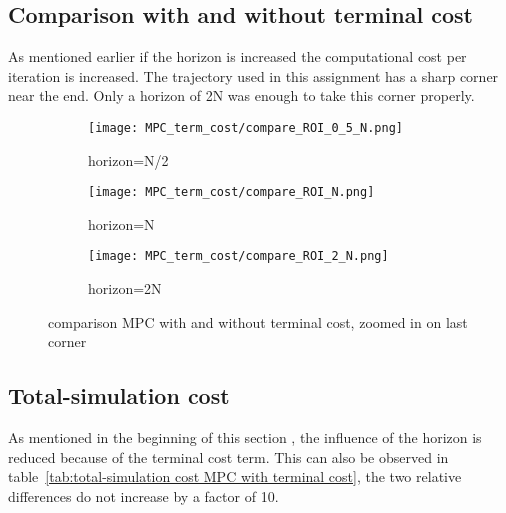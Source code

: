 \subsection{Comparison with and without terminal cost}
As mentioned earlier if the horizon is increased the computational cost per iteration is increased. The trajectory used in this assignment has a sharp corner near the end. Only a horizon of 2N was enough to take this corner properly.

\begin{figure}[H]
	\centering
	\begin{subfigure}[b]{0.45\textwidth}
		\texttt{[image: MPC\_term\_cost/compare\_ROI\_0\_5\_N.png]}
		\caption{horizon=N/2}
	\end{subfigure}
	\begin{subfigure}[b]{0.45\textwidth}
		\texttt{[image: MPC\_term\_cost/compare\_ROI\_N.png]}
		\caption{horizon=N}
	\end{subfigure}
	\begin{subfigure}[b]{0.45\textwidth}
		\texttt{[image: MPC\_term\_cost/compare\_ROI\_2\_N.png]}
		\caption{horizon=2N}
	\end{subfigure}
	\caption{comparison MPC with and without terminal cost, zoomed in on last corner}
\end{figure}

\subsection{Total-simulation cost}
As mentioned in the beginning of this section , the influence of the horizon is reduced because of the terminal cost term. This can also be observed in table~\ref{tab:total-simulation cost MPC with terminal cost}, the two relative differences do not increase by a factor of 10. 

\begin{minipage}{\linewidth}
	\centering
	\label{tab:total-simulation cost MPC with terminal cost} 
	
\end{minipage}

